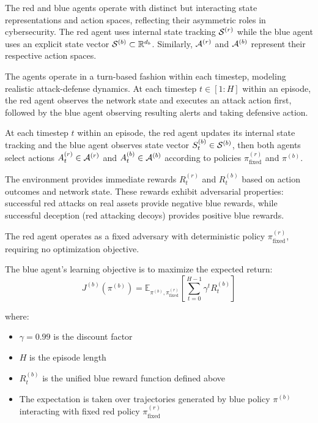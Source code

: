 \documentclass[12pt,oneside]{article}
\begin{document}
The red and blue agents operate with distinct but interacting state representations and action spaces, reflecting their asymmetric roles in cybersecurity. The red agent uses internal state tracking $\mathcal{S}^{(r)}$ while the blue agent uses an explicit state vector $\mathcal{S}^{(b)} \subset \mathbb{R}^{d_b}$. Similarly, $\mathcal{A}^{(r)}$ and $\mathcal{A}^{(b)}$ represent their respective action spaces.

The agents operate in a turn-based fashion within each timestep, modeling realistic attack-defense dynamics. At each timestep $t \in [1:H]$ within an episode, the red agent observes the network state and executes an attack action first, followed by the blue agent observing resulting alerts and taking defensive action.

At each timestep $t$ within an episode, the red agent updates its internal state tracking and the blue agent observes state vector $S_t^{(b)} \in \mathcal{S}^{(b)}$, then both agents select actions $A_t^{(r)} \in \mathcal{A}^{(r)}$ and $A_t^{(b)} \in \mathcal{A}^{(b)}$ according to policies $\pi^{(r)}_{\text{fixed}}$ and $\pi^{(b)}$.

The environment provides immediate rewards $R_t^{(r)}$ and $R_t^{(b)}$ based on action outcomes and network state. These rewards exhibit adversarial properties: successful red attacks on real assets provide negative blue rewards, while successful deception (red attacking decoys) provides positive blue rewards.

The red agent operates as a fixed adversary with deterministic policy $\pi^{(r)}_{\text{fixed}}$, requiring no optimization objective.

The blue agent's learning objective is to maximize the expected return:
\begin{equation}
J^{(b)}(\pi^{(b)}) = \mathbb{E}_{\pi^{(b)}, \pi^{(r)}_{\text{fixed}}}\left[\sum_{t=0}^{H-1} \gamma^t R_t^{(b)}\right]
\end{equation}

where:
\begin{itemize}
\item $\gamma = 0.99$ is the discount factor
\item $H$ is the episode length 
\item $R_t^{(b)}$ is the unified blue reward function defined above
\item The expectation is taken over trajectories generated by blue policy $\pi^{(b)}$ interacting with fixed red policy $\pi^{(r)}_{\text{fixed}}$
\end{itemize}
\end{document}
